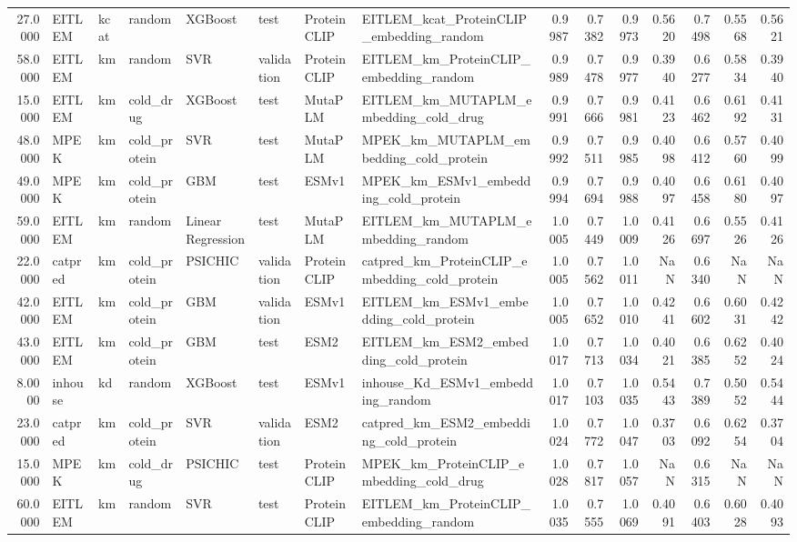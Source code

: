 \begin{tabular}{rlllllllrrrrrrr}
27.0000 & EITLEM & kcat & random & XGBoost & test & ProteinCLIP & EITLEM_kcat_ProteinCLIP_embedding_random & 0.9987 & 0.7382 & 0.9973 & 0.5620 & 0.7498 & 0.5568 & 0.5621 \\
58.0000 & EITLEM & km & random & SVR & validation & ProteinCLIP & EITLEM_km_ProteinCLIP_embedding_random & 0.9989 & 0.7478 & 0.9977 & 0.3940 & 0.6277 & 0.5834 & 0.3940 \\
15.0000 & EITLEM & km & cold_drug & XGBoost & test & MutaPLM & EITLEM_km_MUTAPLM_embedding_cold_drug & 0.9991 & 0.7666 & 0.9981 & 0.4123 & 0.6462 & 0.6192 & 0.4131 \\
48.0000 & MPEK & km & cold_protein & SVR & test & MutaPLM & MPEK_km_MUTAPLM_embedding_cold_protein & 0.9992 & 0.7511 & 0.9985 & 0.4098 & 0.6412 & 0.5760 & 0.4099 \\
49.0000 & MPEK & km & cold_protein & GBM & test & ESMv1 & MPEK_km_ESMv1_embedding_cold_protein & 0.9994 & 0.7694 & 0.9988 & 0.4097 & 0.6458 & 0.6180 & 0.4097 \\
59.0000 & EITLEM & km & random & Linear Regression & test & MutaPLM & EITLEM_km_MUTAPLM_embedding_random & 1.0005 & 0.7449 & 1.0009 & 0.4126 & 0.6697 & 0.5526 & 0.4126 \\
22.0000 & catpred & km & cold_protein & PSICHIC & validation & ProteinCLIP & catpred_km_ProteinCLIP_embedding_cold_protein & 1.0005 & 0.7562 & 1.0011 & NaN & 0.6340 & NaN & NaN \\
42.0000 & EITLEM & km & cold_protein & GBM & validation & ESMv1 & EITLEM_km_ESMv1_embedding_cold_protein & 1.0005 & 0.7652 & 1.0010 & 0.4241 & 0.6602 & 0.6031 & 0.4242 \\
43.0000 & EITLEM & km & cold_protein & GBM & test & ESM2 & EITLEM_km_ESM2_embedding_cold_protein & 1.0017 & 0.7713 & 1.0034 & 0.4021 & 0.6385 & 0.6252 & 0.4024 \\
8.0000 & inhouse & kd & random & XGBoost & test & ESMv1 & inhouse_Kd_ESMv1_embedding_random & 1.0017 & 0.7103 & 1.0035 & 0.5443 & 0.7389 & 0.5052 & 0.5444 \\
23.0000 & catpred & km & cold_protein & SVR & validation & ESM2 & catpred_km_ESM2_embedding_cold_protein & 1.0024 & 0.7772 & 1.0047 & 0.3703 & 0.6092 & 0.6254 & 0.3704 \\
15.0000 & MPEK & km & cold_drug & PSICHIC & test & ProteinCLIP & MPEK_km_ProteinCLIP_embedding_cold_drug & 1.0028 & 0.7817 & 1.0057 & NaN & 0.6315 & NaN & NaN \\
60.0000 & EITLEM & km & random & SVR & test & ProteinCLIP & EITLEM_km_ProteinCLIP_embedding_random & 1.0035 & 0.7555 & 1.0069 & 0.4091 & 0.6403 & 0.6028 & 0.4093 \\

\end{tabular}
